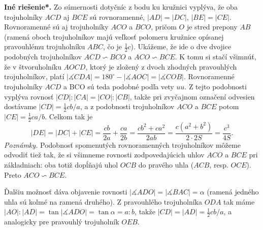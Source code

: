 \documentclass{article}
\newcommand{\ma}{\measuredangle}
\begin{document}
{\textbf{Iné riešenie*.} Zo súmernosti dotyčníc z bodu ku kružnici vyplýva, že oba trojuholníky $ACD$ aj $BCE$ sú rovnoramenné, $|AD| = |DC|$, $|BE| = |CE|$. Rovnoramenné sú aj trojuholníky $ACO$ a $BCO$, pričom $O$ je stred prepony $AB$ (ramená oboch trojuholníkov
majú veľkosť polomeru kružnice opísanej pravouhlému trojuholníku $ABC$, čo je $\frac{1}{2}c$). Ukážeme, že ide o dve dvojice podobných trojuholníkov $ACD \backsim BCO$ a $ACO \backsim BCE$. K tomu si stačí všimnúť, že v štvoruholníku $AOCD$, ktorý je zložený z dvoch zhodných pravouhlých trojuholníkov, platí $| \ma CDA| = 180^\circ -| \ma AOC| = |\ma COB|$. Rovnoramenné trojuholníky $ACD$ a BCO sú teda podobné podľa vety $uu$. Z tejto podobnosti vyplýva rovnosť $|CD| : |CA| = |CO| : |CB|$, takže pri zvyčajnom označení odvesien dostávame $|CD| = \frac{1}{2}cb/a$, a z podobnosti trojuholníkov $ACO$ a $BCE$ potom $|CE| = \frac{1}{2}ca/b$.
Celkom tak je
$$|DE| = |DC| + |CE| = \frac{cb}{2a}+\frac{ca}{2b}=\frac{cb^2 + ca^2}{2ab}= \frac{c(a^2 + b^2)}{2\cdot 2S}=\frac{c^3}{4S}.$$
\textit{Poznámky.} Podobnosť spomenutých rovnoramenných trojuholníkov môžeme odvodiť tiež tak, že si všimneme rovnosti zodpovedajúcich uhlov $ACO$ a $BCE$ pri
základniach: oba totiž dopĺňajú uhol $OCB$ do pravého uhla ($ACB$, resp. $OCE$). Preto
$ACO \backsim BCE$.

Ďalšiu možnosť dáva objavenie rovnosti $|\ma ADO| = |\ma BAC| = \alpha$ (ramená jedného
uhla sú kolmé na ramená druhého). Z  pravouhlého trojuholníka $ODA$ tak máme $|AO|
: |AD| = \tan |\ma ADO| = \tan \alpha = a : b$, takže $|CD| = |AD| = \frac{1}{2}cb/a$, a analogicky pre pravouhlý trojuholník $OEB$.
}
\end{document}
